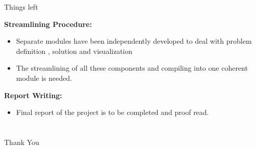 \documentclass{beamer}
\begin{document}

\begin{frame}{Things left}
	

	\textbf{Streamlining Procedure:}
	\begin{itemize}
		\item Separate modules have been independently developed to deal with problem definition , solution and visualization
		\item The streamlining of all these components and compiling into one coherent module is needed.
		
	\end{itemize}
	\vspace{15px}
	\textbf{Report Writing:}
	\begin{itemize}
		\item Final report of the project is to be completed and proof read.
		
		
	\end{itemize}
	
\end{frame}

\part{}
\begin{frame}
	\centering \Large
	\Huge{Thank You}
\end{frame}
\end{document}
